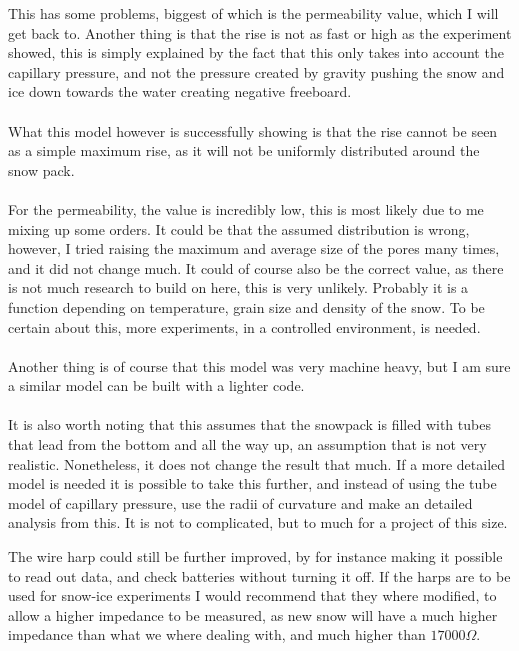 This has some problems, biggest of which is the permeability value, which I will get back to. Another thing is that the rise is not as fast or high as the experiment showed, this is simply explained by the fact that this only takes into account the capillary pressure, and not the pressure created by gravity pushing the snow and ice down towards the water creating negative freeboard.\\
\\
What this model however is successfully showing is that the rise cannot be seen as a simple maximum rise, as it will not be uniformly distributed around the snow pack.\\
\\
For the permeability, the value is incredibly low, this is most likely due to me mixing up some orders. It could be that the assumed distribution is wrong, however, I tried raising the maximum and average size of the pores many times, and it did not change much. It could of course also be the correct value, as there is not much  research to build on here, this is very unlikely. Probably it is a function depending on temperature, grain size and density of the snow. To be certain about this, more experiments, in a controlled environment, is needed.\\
\\
Another thing is of course that this model was very machine heavy, but I am sure a similar model can be built with a lighter code.\\
\\
It is also worth noting that this assumes that the snowpack is filled with tubes that lead from the bottom and all the way up, an assumption that is not very realistic. Nonetheless, it does not change the result that much. If a more detailed model is needed it is possible to take this further, and instead of using the tube model of capillary pressure, use the radii of curvature and make an detailed analysis from this. It is not to complicated, but to much for a project of this size.

The wire harp could still be further improved, by for instance making it
possible to read out data, and check batteries without turning it off. If the
harps are to be used for snow-ice experiments I would recommend that they where
modified, to allow a higher impedance to be measured, as new snow will have a
much higher impedance than what we where dealing with, and much higher than
$17000 \Omega$. 




